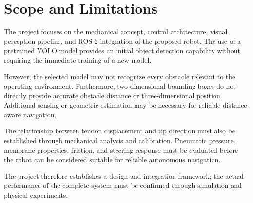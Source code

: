 \section{Scope and Limitations}

The project focuses on the mechanical concept, control architecture, visual perception pipeline, and ROS 2 integration of the proposed robot. The use of a pretrained YOLO model provides an initial object detection capability without requiring the immediate training of a new model.

However, the selected model may not recognize every obstacle relevant to the operating environment. Furthermore, two-dimensional bounding boxes do not directly provide accurate obstacle distance or three-dimensional position. Additional sensing or geometric estimation may be necessary for reliable distance-aware navigation.

The relationship between tendon displacement and tip direction must also be established through mechanical analysis and calibration. Pneumatic pressure, membrane properties, friction, and steering response must be evaluated before the robot can be considered suitable for reliable autonomous navigation.

The project therefore establishes a design and integration framework; the actual performance of the complete system must be confirmed through simulation and physical experiments.